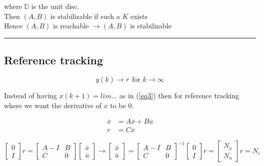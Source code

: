 \documentclass[a4paper]{article}
\begin{document}
where $ \mathbb{D}$ is the unit disc. \\
\vspace{5pt}
Then $ (A,B)  $ is stabilizable if such a $ K $ exists \\
Hence $ (A,B) $ is reachable $ \rightarrow (A,B) $ is stabilizable

\vspace{5pt}
\hrule
\vspace{5pt}
\subsection{Reference tracking}
\begin{equation}
	y(k) \rightarrow r \hspace{5pt} \text{for } k \rightarrow \infty 
\end{equation}

Instead of having $ x(k+1) = lim ... $ as in  (\ref{eq3})  then for reference tracking where we want the derivative of $ x $ to be  $ 0 $. 

 \begin{align}
	 \overline{x} &= A \overline{x} + B \overline{u} \label{eq9}\\ 
r &= C \overline{x}
\end{align}

\begin{equation}
\begin{bmatrix}
0 \\
I
\end{bmatrix} r = \begin{bmatrix}
A - I & B \\
C & 0
\end{bmatrix} \begin{bmatrix}
\overline{x} \\
\overline{u}
\end{bmatrix} \rightarrow \begin{bmatrix}
\overline{x} \\
\overline{u}
\end{bmatrix} = \begin{bmatrix}
A - I & B \\
C & 0
\end{bmatrix}^{-1} \begin{bmatrix}
0 \\
I
\end{bmatrix} r = \begin{bmatrix}
N_x \\
N_u
\end{bmatrix} r = N_r
\end{equation}
\end{document}
